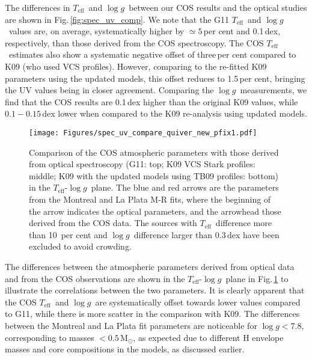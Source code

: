 \documentclass[fleqn,usenatbib, useAMS]{mnras}
\newcommand{\Teff}{\mbox{$T_{\mathrm{eff}}$}}
\newcommand{\logg}{\mbox{$\log g$}}
\newcommand{\Msun}{\mbox{$\mathrm{M_\odot}$}}
\begin{document}
The differences in \Teff\ and \logg\ between our COS results and the optical studies are shown in Fig.\,\ref{fig:spec_uv_comp}.  We note that the G11 \Teff\ and \logg\ values are, on average, systematically higher by $\simeq5$\,per cent and 0.1\,dex, respectively, than those derived from the COS spectroscopy. The COS \Teff\ estimates also show a systematic negative offset of three\,per cent compared to K09 (who used VCS profiles). However, comparing to the re-fitted K09 parameters using the updated models, this offset reduces to 1.5\,per cent, bringing the UV values being in closer agreement. Comparing the \logg\ measurements, we find that the COS results are 0.1\,dex higher than the original K09 values, while $0.1-0.15$\,dex lower when compared to the K09 re-analysis using updated models.  

\begin{figure}
\centering
\texttt{[image: Figures/spec\_uv\_compare\_quiver\_new\_pfix1.pdf]}
\caption{Comparison of the COS atmospheric parameters with those derived from optical spectroscopy (G11: top; K09 VCS Stark profiles: middle; K09 with the updated models using TB09 profiles: bottom) in the \Teff-\logg\ plane. The blue and red arrows are the parameters from the Montreal and La Plata M-R fits, where the beginning of the arrow indicates the optical parameters, and the arrowhead those derived from the COS data. The sources with \Teff\ difference more than 10~per cent and \logg\ difference larger than 0.3\,dex have been excluded to avoid crowding.} 
\label{fig:spec_uv_arrow}
\end{figure}

The differences between the atmospheric parameters derived from optical data and from the COS observations are shown in the \Teff\--\logg\ plane in Fig.\,\ref{fig:spec_uv_arrow} to illustrate the correlations between the two parameters. It is clearly apparent that the COS \Teff\ and \logg\ are systematically offset towards lower values compared to G11, while there is more scatter in the comparison with K09. The differences between the Montreal and La Plata fit parameters are noticeable for $\logg<7.8$, corresponding to masses $<0.5\,\Msun$, as expected due to different H envelope masses and core compositions in the models, as discussed earlier. 
\end{document}
